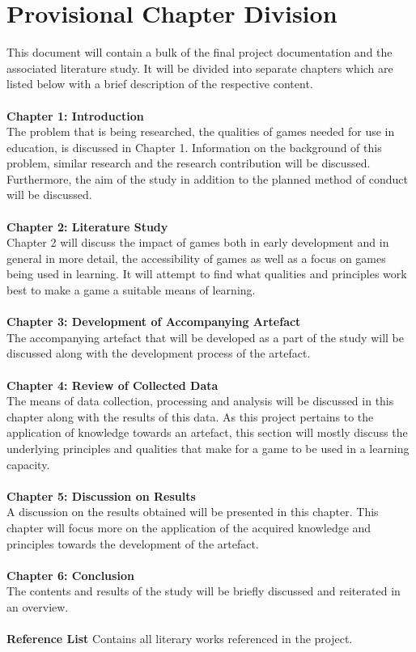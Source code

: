 \section{Provisional Chapter Division}
This document will contain a bulk of the final project documentation and the associated literature study. It will be divided into separate chapters which are listed below with a brief description of the respective content.
\\\\
\textbf{Chapter 1: Introduction} \\	
The problem that is being researched, the qualities of games needed for use in education, is discussed in Chapter 1. Information on the background of this problem, similar research and the research contribution will be discussed. Furthermore, the aim of the study in addition to the planned method of conduct will be discussed.
\\\\
\textbf{Chapter 2: Literature Study} \\
Chapter 2 will discuss the impact of games both in early development and in general in more detail, the accessibility of games as well as a focus on games being used in learning. It will attempt to find what qualities and principles work best to make a game a suitable means of learning.
\\\\
\textbf{Chapter 3: Development of Accompanying Artefact} \\
The accompanying artefact that will be developed as a part of the study will be discussed along with the development process of the artefact.
\\\\
\textbf{Chapter 4: Review of Collected Data} \\
The means of data collection, processing and analysis will be discussed in this chapter along with the results of this data. As this project pertains to the application of knowledge towards an artefact, this section will mostly discuss the underlying principles and qualities that make for a game to be used in a learning capacity.
\\\\
\textbf{Chapter 5: Discussion on Results} \\
A discussion on the results obtained will be presented in this chapter. This chapter will focus more on the application of the acquired knowledge and principles towards the development of the artefact.
\\\\
\textbf{Chapter 6: Conclusion} \\
The contents and results of the study will be briefly discussed and reiterated in an overview.
\\\\
\textbf{Reference List}
Contains all literary works referenced in the project.

